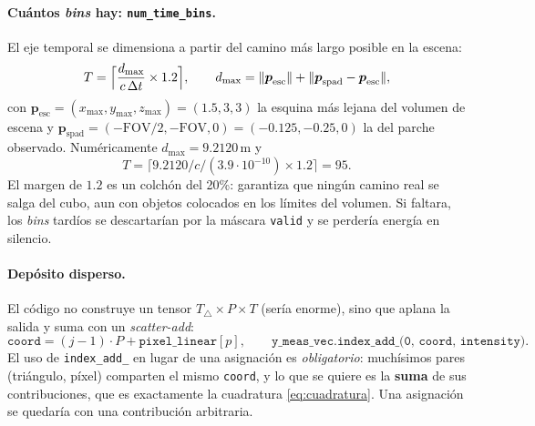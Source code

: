 \documentclass[11pt,a4paper]{article}
\newcommand{\vect}[1]{\boldsymbol{#1}}
\newcommand{\code}[1]{\texttt{#1}}
\theoremstyle{definition}
\theoremstyle{plain}
\begin{document}
\paragraph{Cuántos \emph{bins} hay: \code{num\_time\_bins}.}
El eje temporal se dimensiona a partir del camino más largo posible en la
escena:
%
\begin{equation}
\label{eq:T}
T = \Bigl\lceil \frac{d_{\max}}{c\,\Delta t}\times 1.2\Bigr\rceil,
\qquad
d_{\max} = \lVert \vect p_{\text{esc}}\rVert +
           \lVert \vect p_{\text{spad}}-\vect p_{\text{esc}}\rVert ,
\end{equation}
%
con $\vect p_{\text{esc}}=(x_{\max},y_{\max},z_{\max})=(1.5,3,3)$ la esquina más
lejana del volumen de escena y
$\vect p_{\text{spad}}=(-\text{FOV}/2,-\text{FOV},0)=(-0.125,-0.25,0)$ la del
parche observado. Numéricamente $d_{\max}=9.2120\,$m y
%
\[
T = \bigl\lceil 9.2120/c/(3.9\cdot10^{-10})\times1.2 \bigr\rceil = 95 .
\]
%
El margen de $1.2$ es un colchón del 20\%: garantiza que ningún camino real
se salga del cubo, aun con objetos colocados en los límites del volumen. Si
faltara, los \emph{bins} tardíos se descartarían por la máscara \code{valid} y
se perdería energía en silencio.

\paragraph{Depósito disperso.}
El código no construye un tensor $T_\triangle\times P\times T$ (sería enorme),
sino que aplana la salida y suma con un \emph{scatter-add}:
%
\begin{equation}
\label{eq:coord}
\texttt{coord} = (j-1)\cdot P + \texttt{pixel\_linear}[p],
\qquad
\texttt{y\_meas\_vec.index\_add\_(0, coord, intensity)} .
\end{equation}
%
El uso de \code{index\_add\_} en lugar de una asignación es \emph{obligatorio}:
muchísimos pares (triángulo, píxel) comparten el mismo \code{coord}, y lo que se
quiere es la \textbf{suma} de sus contribuciones, que es exactamente la
cuadratura \eqref{eq:cuadratura}. Una asignación se quedaría con una
contribución arbitraria.
\end{document}
